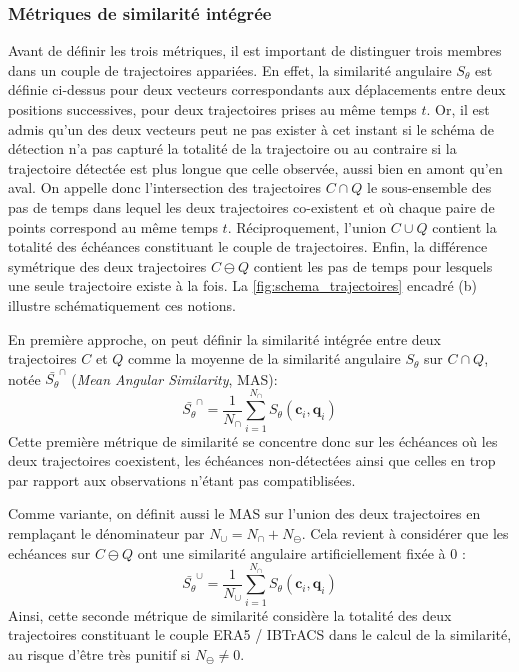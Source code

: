 \documentclass[../main.tex]{subfiles}
\begin{document}
\subsubsection*{Métriques de similarité intégrée}\label{sec:definition_MAS}

Avant de définir les trois métriques, il est important de distinguer trois membres dans un couple de trajectoires appariées. En effet, la similarité angulaire
$S_\theta$ est définie ci-dessus pour deux vecteurs correspondants aux déplacements entre deux positions successives, pour deux trajectoires prises au même
temps $t$. Or, il est admis qu'un des deux vecteurs peut ne pas exister à cet instant si le schéma de détection n'a pas capturé la totalité de la trajectoire ou
au contraire si la trajectoire détectée est plus longue que celle observée, aussi bien en amont qu'en aval. On appelle donc l'intersection des trajectoires $C
\cap Q$ le sous-ensemble des pas de temps dans lequel les deux trajectoires co-existent et où chaque paire de points correspond au même temps $t$.
Réciproquement, l'union $C \cup Q$ contient la totalité des échéances constituant le couple de trajectoires. Enfin, la différence symétrique des deux
trajectoires $C \ominus Q$ contient les pas de temps pour lesquels une seule trajectoire existe à la fois. La \cref{fig:schema_trajectoires} encadré (b)
illustre schématiquement ces notions.

En première approche, on peut définir la similarité intégrée entre deux trajectoires $C$ et $Q$ comme la moyenne de la similarité angulaire $S_\theta$ sur $C
\cap Q$, notée $\bar{S_\theta}^\cap$ (\textit{Mean Angular Similarity}, MAS):
%
\begin{equation}
    \bar{S_\theta}^\cap = \frac{1}{N_\cap} \sum_{i=1}^{N_\cap} S_\theta (\mathbf{c}_i, \mathbf{q}_i) \tag*{MAS$^\cap$}
\end{equation}
%
Cette première métrique de similarité se concentre donc sur les échéances où les deux trajectoires coexistent, les échéances non-détectées ainsi que celles en
trop par rapport aux observations n'étant pas compatiblisées.

Comme variante, on définit aussi le MAS sur l'union des deux trajectoires en remplaçant le dénominateur par $N_\cup = N_\cap + N_\ominus$. Cela revient
à considérer que les echéances sur $C \ominus Q$ ont une similarité angulaire artificiellement fixée à \num{0} :
%
\begin{equation}
    \bar{S_\theta}^\cup = \frac{1}{N_\cup} \sum_{i=1}^{N_\cap} S_\theta (\mathbf{c}_i, \mathbf{q}_i) \tag*{MAS$^\cup$}
\end{equation}
%
Ainsi, cette seconde métrique de similarité considère la totalité des deux trajectoires constituant le couple ERA5 / IBTrACS dans le calcul de la similarité, au
risque d'être très punitif si $N_\ominus \neq 0$.
\end{document}
